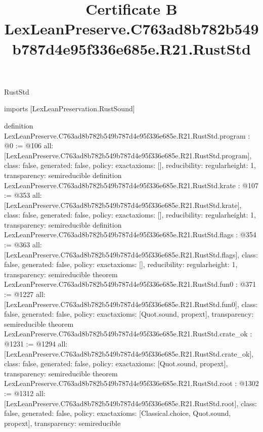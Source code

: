 \begin{lexlean}{RustStd}
\title{Certificate B LexLeanPreserve.C763ad8b782b549b787d4e95f336e685e.R21.RustStd}
\begin{coremodule}
imports [LexLeanPreservation.RustSound]

definition LexLeanPreserve.C763ad8b782b549b787d4e95f336e685e.R21.RustStd.program : @0 := @106 {
  all: [LexLeanPreserve.C763ad8b782b549b787d4e95f336e685e.R21.RustStd.program],
  class: false,
  generated: false,
  policy: exact{axioms: []},
  reducibility: regular{height: 1},
  transparency: semireducible
}
definition LexLeanPreserve.C763ad8b782b549b787d4e95f336e685e.R21.RustStd.krate : @107 := @353 {
  all: [LexLeanPreserve.C763ad8b782b549b787d4e95f336e685e.R21.RustStd.krate],
  class: false,
  generated: false,
  policy: exact{axioms: []},
  reducibility: regular{height: 1},
  transparency: semireducible
}
definition LexLeanPreserve.C763ad8b782b549b787d4e95f336e685e.R21.RustStd.flags : @354 := @363 {
  all: [LexLeanPreserve.C763ad8b782b549b787d4e95f336e685e.R21.RustStd.flags],
  class: false,
  generated: false,
  policy: exact{axioms: []},
  reducibility: regular{height: 1},
  transparency: semireducible
}
theorem LexLeanPreserve.C763ad8b782b549b787d4e95f336e685e.R21.RustStd.fun0 : @371 := @1227 {
  all: [LexLeanPreserve.C763ad8b782b549b787d4e95f336e685e.R21.RustStd.fun0],
  class: false,
  generated: false,
  policy: exact{axioms: [Quot.sound, propext]},
  transparency: semireducible
}
theorem LexLeanPreserve.C763ad8b782b549b787d4e95f336e685e.R21.RustStd.crate_ok : @1231 := @1294 {
  all: [LexLeanPreserve.C763ad8b782b549b787d4e95f336e685e.R21.RustStd.crate_ok],
  class: false,
  generated: false,
  policy: exact{axioms: [Quot.sound, propext]},
  transparency: semireducible
}
theorem LexLeanPreserve.C763ad8b782b549b787d4e95f336e685e.R21.RustStd.root : @1302 := @1312 {
  all: [LexLeanPreserve.C763ad8b782b549b787d4e95f336e685e.R21.RustStd.root],
  class: false,
  generated: false,
  policy: exact{axioms: [Classical.choice, Quot.sound, propext]},
  transparency: semireducible
}


\end{coremodule}
\end{lexlean}

